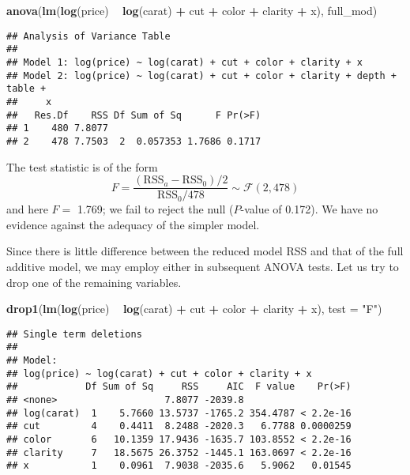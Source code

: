 \documentclass[]{book}
\newenvironment{Shaded}{\begin{snugshade}}{\end{snugshade}}
\newcommand{\DataTypeTok}[1]{\textcolor[rgb]{0.13,0.29,0.53}{#1}}
\newcommand{\KeywordTok}[1]{\textcolor[rgb]{0.13,0.29,0.53}{\textbf{#1}}}
\newcommand{\NormalTok}[1]{#1}
\newcommand{\OperatorTok}[1]{\textcolor[rgb]{0.81,0.36,0.00}{\textbf{#1}}}
\newcommand{\StringTok}[1]{\textcolor[rgb]{0.31,0.60,0.02}{#1}}
\theoremstyle{definition}
\theoremstyle{definition}
\theoremstyle{definition}
\theoremstyle{remark}
\begin{document}
\begin{Shaded}
\begin{Highlighting}[]
\KeywordTok{anova}\NormalTok{(}\KeywordTok{lm}\NormalTok{(}\KeywordTok{log}\NormalTok{(price) }\OperatorTok{~}\StringTok{ }\KeywordTok{log}\NormalTok{(carat) }\OperatorTok{+}\StringTok{ }\NormalTok{cut }\OperatorTok{+}\StringTok{ }\NormalTok{color }\OperatorTok{+}\StringTok{ }\NormalTok{clarity }\OperatorTok{+}\StringTok{ }\NormalTok{x), full_mod)}
\end{Highlighting}
\end{Shaded}

\begin{verbatim}
## Analysis of Variance Table
## 
## Model 1: log(price) ~ log(carat) + cut + color + clarity + x
## Model 2: log(price) ~ log(carat) + cut + color + clarity + depth + table + 
##     x
##   Res.Df    RSS Df Sum of Sq      F Pr(>F)
## 1    480 7.8077                           
## 2    478 7.7503  2  0.057353 1.7686 0.1717
\end{verbatim}

The test statistic is of the form
\[F = \frac{(\mathrm{RSS}_a-\mathrm{RSS}_0)/2}{\mathrm{RSS}_0/478}\sim \mathcal{F}(2, 478)\]
and here \(F=\) 1.769; we fail to reject the null (\(P\)-value of 0.172). We have no evidence against the adequacy of the simpler model.

Since there is little difference between the reduced model RSS and that of the full additive model, we may employ either in subsequent ANOVA tests.
Let us try to drop one of the remaining variables.

\begin{Shaded}
\begin{Highlighting}[]
\KeywordTok{drop1}\NormalTok{(}\KeywordTok{lm}\NormalTok{(}\KeywordTok{log}\NormalTok{(price) }\OperatorTok{~}\StringTok{ }\KeywordTok{log}\NormalTok{(carat) }\OperatorTok{+}\StringTok{ }\NormalTok{cut }\OperatorTok{+}\StringTok{ }\NormalTok{color }\OperatorTok{+}\StringTok{ }\NormalTok{clarity }\OperatorTok{+}\StringTok{ }\NormalTok{x), }\DataTypeTok{test =} \StringTok{"F"}\NormalTok{)}
\end{Highlighting}
\end{Shaded}

\begin{verbatim}
## Single term deletions
## 
## Model:
## log(price) ~ log(carat) + cut + color + clarity + x
##            Df Sum of Sq     RSS     AIC  F value    Pr(>F)
## <none>                   7.8077 -2039.8                   
## log(carat)  1    5.7660 13.5737 -1765.2 354.4787 < 2.2e-16
## cut         4    0.4411  8.2488 -2020.3   6.7788 0.0000259
## color       6   10.1359 17.9436 -1635.7 103.8552 < 2.2e-16
## clarity     7   18.5675 26.3752 -1445.1 163.0697 < 2.2e-16
## x           1    0.0961  7.9038 -2035.6   5.9062   0.01545
\end{verbatim}
\end{document}
